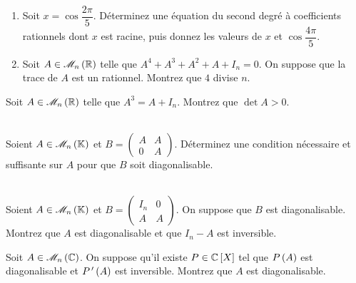 \begin{exo}~\\
\begin{enumerate}
    \item Soit \(x=\cos\dfrac{2\pi}{5}\). Déterminez une équation du second degré à coefficients rationnels dont \(x\) est racine, puis donnez les valeurs de \(x\) et \(\cos\dfrac{4\pi}{5}\). \\
    \item Soit \(A\in\M{n}[\R]\) telle que \(A^4+A^3+A^2+A+I_n=0\). On suppose que la trace de \(A\) est un rationnel. Montrez que \(4\) divise \(n\).
\end{enumerate}
\end{exo}



\begin{exo}
Soit \(A\in\M{n}[\R]\) telle que \(A^3=A+I_n\). Montrez que \(\det A>0\).
\end{exo}



\begin{exo}~\\
Soient \(A\in\M{n}\) et \(B=\begin{pmatrix}
A & A \\
0 & A
\end{pmatrix}\). Déterminez une condition nécessaire et suffisante sur \(A\) pour que \(B\) soit diagonalisable.
\end{exo}



\begin{exo}~\\
Soient \(A\in\M{n}\) et \(B=\begin{pmatrix}
I_n & 0 \\
A & A
\end{pmatrix}\). On suppose que \(B\) est diagonalisable. Montrez que \(A\) est diagonalisable et que \(I_n-A\) est inversible.
\end{exo}



\begin{exo}
Soit \(A\in\M{n}[\C]\). On suppose qu'il existe \(P\in\poly[\C]\) tel que \(P\left(A\right)\) est diagonalisable et \(P^{\,\prime}\left(A\right)\) est inversible. Montrez que \(A\) est diagonalisable.
\end{exo}



